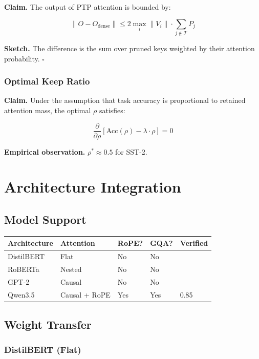 {\textbf{Claim.} The output of PTP attention is bounded by:

\[
\|O - O_\text{dense}\| \leq 2 \max_i \|V_i\| \cdot \sum_{j \notin \mathcal{T}} P_j
\tag{4.9}
\]

\textbf{Sketch.} The difference is the sum over pruned keys weighted by their 
attention probability. $\square$

\subsubsection{Optimal Keep Ratio}

\textbf{Claim.} Under the assumption that task accuracy is proportional to 
retained attention mass, the optimal $\rho$ satisfies:

\[
\frac{\partial}{\partial \rho} \left[\text{Acc}(\rho) - \lambda \cdot \rho\right] = 0
\tag{4.10}
\]

\textbf{Empirical observation.} $\rho^* \approx 0.5$ for SST-2.




\section{Architecture Integration}

\subsection{Model Support}

\begin{table}[H]
\centering
\small
\begin{tabular}{lllll}
\toprule
\textbf{Architecture} & \textbf{Attention} & \textbf{RoPE?} & \textbf{GQA?} & \textbf{Verified} \\
\midrule
DistilBERT & Flat & No & No &  \\
RoBERTa & Nested & No & No &  \\
GPT-2 & Causal & No & No &  \\
Qwen3.5 & Causal + RoPE & Yes & Yes & 0.85 \\
\bottomrule
\end{tabular}
\end{table}

\subsection{Weight Transfer}

\subsubsection{DistilBERT (Flat)}

}
